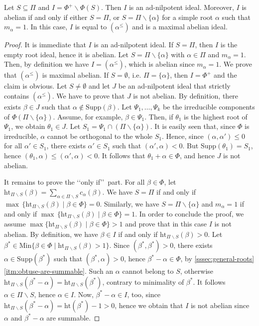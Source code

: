 \documentclass[ALCO,published]{cedram}
\theoremstyle{plain}
\newcommand\smeno{\smallsetminus}
\newcommand\Min{\mathrm{Min}}
\newcommand\supp{\mathrm{Supp}}
\newcommand\alt{\mathrm{ht}}
\newcommand\al{\alpha}
\newcommand\be{\beta}
\renewcommand{\leq}{\leqslant}
\begin{document}
\begin{pro}\label{pro:simple-principal}
Let $S\subseteq\Pi$ and $I=\Phi^+\smeno \Phi(S)$. 
Then $I$ is an ad-nilpotent ideal. 
Moreover, $I$ is abelian if and only if either $S=\Pi$, or $S=\Pi\smeno\{\al\} $ for  a simple root $\al$ such that $m_\al=1$. 
In this case, $I$ is equal to $(\alpha^\leq)$ and is a maximal abelian ideal.
\end{pro}

\begin{proof}
It is immediate that  $I$ is an ad-nilpotent ideal. 
If $S=\Pi$, then $I$ is the empty root ideal, hence it is abelian. 
Let  $S=\Pi\smeno \{\al\}$ with $\al\in \Pi$ and $m_\al=1$. 
Then, by definition we have $I=(\al^\leq)$, which is abelian  since $m_\al=1$.
We prove that $(\al^\leq)$ is maximal abelian. 
If $S= \emptyset$, i.e. $\Pi=\{\al\}$,  then $I=\Phi^+$ and the claim is obvious. 
Let $S\neq \emptyset$ and let $J$ be an ad-nilpotent ideal that strictly contains $(\al^\leq)$.
We have to prove that $J$ is not abelian. 
By definition, there exists $\be\in J$ such that $\al\not\in\supp(\be)$.
Let $\Psi_1, \dots, \Psi_k$ be the irreducible components of $\Phi(\Pi\smeno \{\al\})$. 
Assume, for example, $\be\in \Psi_1$. 
Then, if  $\theta_1$ is the highest root of $\Psi_1$, we obtain $\theta_1\in J$.  
Let $S_1=\Psi_1\cap (\Pi\smeno\{\al\})$.
It is easily seen that, since $\Phi$ is irreducible, $\al$ cannot be orthogonal to the whole $S_1$. 
Hence, since $(\al, \al')\leq 0$ for all $\al'\in S_1$, there exists $\al'\in S_1$ such that $(\al',\al)< 0$. 
But $\supp(\theta_1)=S_1$, hence $(\theta_1,\al)\leq (\al', \al)< 0$. It follows that $\theta_1+\al\in \Phi$, and hence $J$ is not abelian.  

\par
It remains to prove the \lq\lq only if\rq\rq\ part. 
For all $\be\in \Phi$, let $\alt_{\Pi\smeno S}(\be)=\sum\limits_{\al\in\Pi\smeno S}c_\al(\be)$.
We have $S=\Pi$ if and only if  $\max\,\{\alt_{\Pi\smeno S}(\be)\mid\be\in \Phi\}=0$.
Similarly, we have $S=\Pi\smeno \{\al\}$ and $m_\al=1$ if and only if  $\max\,\{\alt_{\Pi\smeno S}(\be)\mid\be\in \Phi\}= 1$.
In order to conclude the proof, we assume $\max\{\alt_{\Pi\smeno S}(\be)\mid\be\in \Phi\}> 1$ and  prove that in this case $I$ is not abelian.
By definition, we have $\be\in I$ if and only if  $\alt_{\Pi\smeno S}(\be)>0$.
Let $\be^*\in \Min\{\be\in \Phi \mid \alt_{\Pi\smeno S}(\be)>1\}$. 
Since $(\be^*, \be^*)> 0$, there exists $\al\in \supp(\be^*)$ such that $(\be^*, \al)>0$, hence $\be^*-\al\in \Phi$, by \ref{sssec:general-roots}\ref{itm:obtuse-are-summable}. 
Such an $\al$ cannot belong to $S$, otherwise $\alt_{\Pi\smeno S}(\be^*-\al)=\alt_{\Pi\smeno S}(\be^*)$, contrary to minimality of $\be^*$. 
It follows $\al\in \Pi\smeno S$, hence $\al\in I$.
Now, $\be^*-\al\in I$, too, since $\alt_{\Pi\smeno S}(\be^*-\al)=\alt(\be^*)-1>0$, hence we obtain that $I$ is not abelian since $\al$ and $\be^*-\al$ are summable. 
\end{proof}
\end{document}
